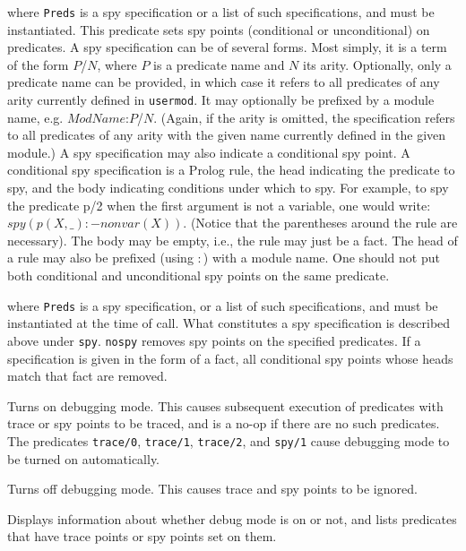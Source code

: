 \begin{description}
    where {\tt Preds} is a spy specification or a list of such
    specifications, and must be instantiated. This predicate sets spy
    points (conditional or unconditional) on predicates.  A spy
    specification can be of several forms. Most simply, it is a term
    of the form $P$/$N$, where $P$ is a predicate name and $N$ its
    arity.  Optionally, only a predicate name can be provided, in
    which case it refers to all predicates of any arity currently
    defined in {\tt usermod}.  It may optionally be prefixed by a
    module name, e.g.  $ModName$:$P$/$N$. (Again, if the arity is
    omitted, the specification refers to all predicates of any arity
    with the given name currently defined in the given module.)  A spy
    specification may also indicate a conditional spy point. A
    conditional spy specification is a Prolog rule, the head
    indicating the predicate to spy, and the body indicating
    conditions under which to spy. For example, to spy the predicate
    p/2 when the first argument is not a variable, one would write:
    $spy (p(X,\_):-nonvar(X)).$ (Notice that the parentheses around
    the rule are necessary). The body may be empty, i.e., the rule may
    just be a fact.  The head of a rule may also be prefixed (using
    $:$) with a module name. One should not put both conditional and
    unconditional spy points on the same predicate.

    where {\tt Preds} is a spy specification, or a list of such
    specifications, and must be instantiated at the time of call.  What
    constitutes a spy specification is described above under {\tt spy}.
    {\tt nospy} removes spy points on the specified predicates. If a
    specification is given in the form of a fact, all conditional spy points
    whose heads match that fact are removed.

    Turns on debugging mode.
    This causes subsequent execution of predicates with trace or spy
    points to be traced, and is a no-op if there are no such predicates.
    The predicates {\tt trace/0}, {\tt trace/1}, \texttt{trace/2},  and {\tt spy/1} cause debugging mode
    to be turned on automatically.

    Turns off debugging mode.  This causes trace and spy points to be ignored.

    Displays information about whether debug mode is on or not, and lists
    predicates that have trace points or spy points set on them.


\end{description}
